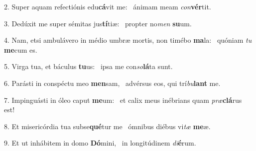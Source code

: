 2. Super aquam refectiónis edu\textbf{cá}vit me: \ast\  ánimam meam \textit{con}\textbf{vér}tit.\

3. Dedúxit me super sémitas jus\textbf{tí}tiæ: \ast\  propter no\textit{men} \textbf{su}um.\

4. Nam, etsi ambulávero in médio umbræ mortis, non timébo \textbf{ma}la: \ast\  quóniam \textit{tu} \textbf{me}cum es.\

5. Virga tua, et báculus \textbf{tu}us: \ast\  ipsa me con\textit{so}\textbf{lá}ta sunt.\

6. Parásti in conspéctu meo \textbf{men}sam, \ast\  advérsus eos, qui trí\textit{bu}\textbf{lant} me.\

7. Impinguásti in óleo caput \textbf{me}um: \ast\  et calix meus inébrians quam \textit{præ}\textbf{clá}rus est!\

8. Et misericórdia tua subse\textbf{qué}tur me \ast\  ómnibus diébus vi\textit{tæ} \textbf{me}æ.\

9. Et ut inhábitem in domo \textbf{Dó}mini, \ast\  in longitúdinem \textit{di}\textbf{é}rum.\

